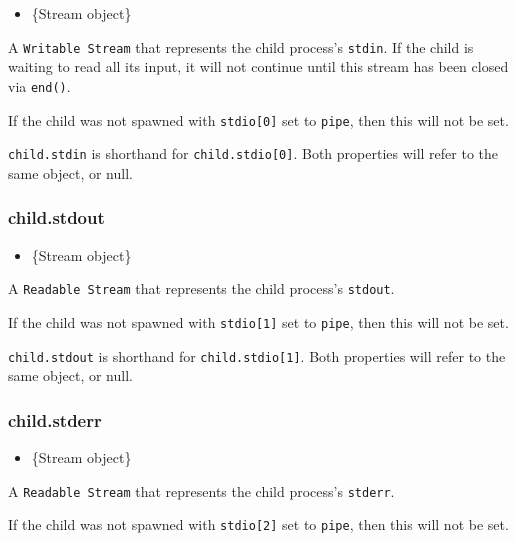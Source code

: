 \begin{itemize}
\itemsep1pt\parskip0pt
\item
  \{Stream object\}
\end{itemize}

A \texttt{Writable\ Stream} that represents the child process's
\texttt{stdin}. If the child is waiting to read all its input, it will
not continue until this stream has been closed via \texttt{end()}.

If the child was not spawned with \texttt{stdio{[}0{]}} set to
\texttt{\textquotesingle{}pipe\textquotesingle{}}, then this will not be
set.

\texttt{child.stdin} is shorthand for \texttt{child.stdio{[}0{]}}. Both
properties will refer to the same object, or null.

\subsubsection{child.stdout}\label{child.stdout}

\begin{itemize}
\itemsep1pt\parskip0pt
\item
  \{Stream object\}
\end{itemize}

A \texttt{Readable\ Stream} that represents the child process's
\texttt{stdout}.

If the child was not spawned with \texttt{stdio{[}1{]}} set to
\texttt{\textquotesingle{}pipe\textquotesingle{}}, then this will not be
set.

\texttt{child.stdout} is shorthand for \texttt{child.stdio{[}1{]}}. Both
properties will refer to the same object, or null.

\subsubsection{child.stderr}\label{child.stderr}

\begin{itemize}
\itemsep1pt\parskip0pt
\item
  \{Stream object\}
\end{itemize}

A \texttt{Readable\ Stream} that represents the child process's
\texttt{stderr}.

If the child was not spawned with \texttt{stdio{[}2{]}} set to
\texttt{\textquotesingle{}pipe\textquotesingle{}}, then this will not be
set.

